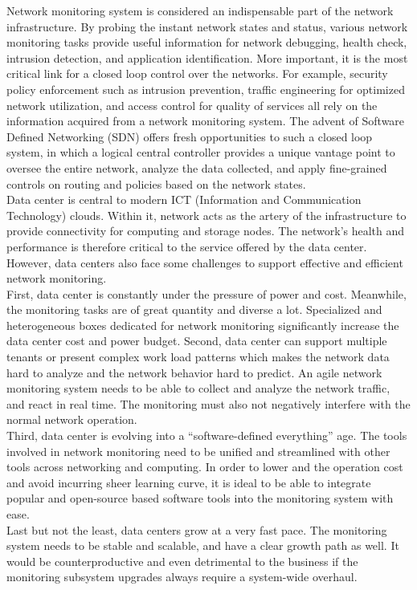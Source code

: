 \documentclass{acm_proc_article-sp}
\begin{document}
Network monitoring system is considered an indispensable part of the network infrastructure. By probing the instant network states and status, various network monitoring tasks provide useful information for network debugging, health check, intrusion detection, and application identification. More important, it is the most critical link for a closed loop control over the networks. For example, security policy enforcement such as intrusion prevention, traffic engineering for optimized network utilization, and access control for quality of services all rely on the information acquired from a network monitoring system. The advent of Software Defined Networking (SDN) offers fresh opportunities to such a closed loop system, in which a logical central controller provides a unique vantage point to oversee the entire network, analyze the data collected, and apply fine-grained controls on routing and policies based on the network states.\\
Data center is central to modern ICT (Information and Communication Technology) clouds. Within it, network acts as the artery of the infrastructure to provide connectivity for computing and storage nodes. The network’s health and performance is therefore critical to the service offered by the data center. However, data centers also face some challenges to support effective and efficient network monitoring.\\
First, data center is constantly under the pressure of power and cost. Meanwhile, the monitoring tasks are of great quantity and diverse a lot. Specialized and heterogeneous boxes dedicated for network monitoring significantly increase the data center cost and power budget.
Second, data center can support multiple tenants or present complex work load patterns which makes the network data hard to analyze and the network behavior hard to predict. An agile network monitoring system needs to be able to collect and analyze the network traffic, and react in real time. The monitoring must also not negatively interfere with the normal network operation.\\
Third, data center is evolving into a “software-defined everything” age. The tools involved in network monitoring need to be unified and streamlined with other tools across
networking and computing. In order to lower and the operation cost and avoid incurring sheer learning curve, it is ideal to be able to integrate popular and open-source based software tools into the monitoring system with ease.\\
Last but not the least, data centers grow at a very fast pace. The monitoring system needs to be stable and scalable, and have a clear growth path as well. It would be counterproductive and even detrimental to the business if the monitoring subsystem upgrades always require a system-wide overhaul.\\
\end{document}
